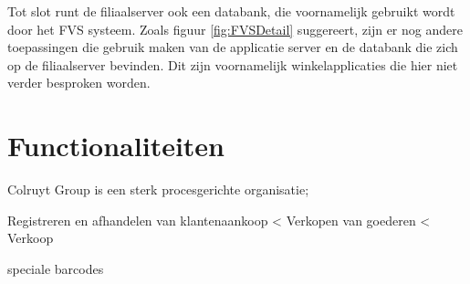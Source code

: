 Tot slot runt de filiaalserver ook een databank, die voornamelijk gebruikt wordt door het FVS systeem. Zoals figuur \ref{fig:FVSDetail} suggereert, zijn er nog andere toepassingen die gebruik maken van de applicatie server en de databank die zich op de filiaalserver bevinden. Dit zijn voornamelijk winkelapplicaties die hier niet verder besproken worden.

\section{Functionaliteiten}

Colruyt Group is een sterk procesgerichte organisatie; 

Registreren en afhandelen van klantenaankoop < Verkopen van goederen < Verkoop

speciale barcodes